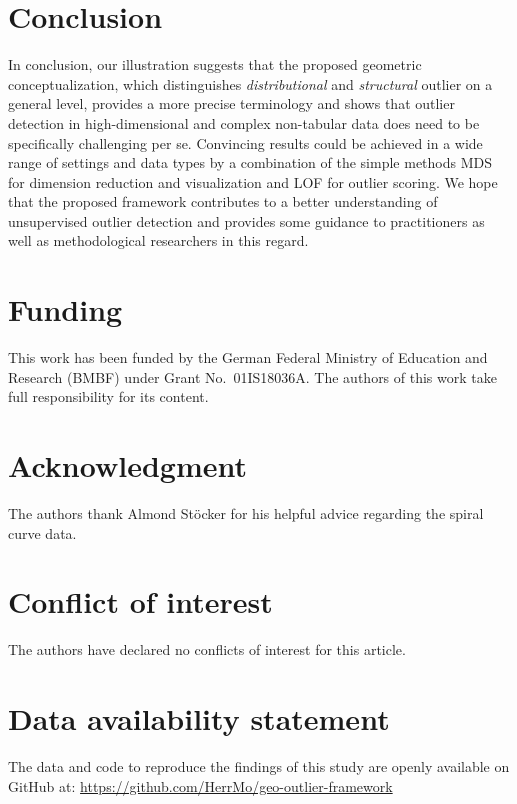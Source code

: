 \documentclass[
  10pt]{article}
\begin{document}
\hypertarget{sec:conclusion}{%
\section{Conclusion}\label{sec:conclusion}}

In conclusion, our illustration suggests that the proposed geometric conceptualization, which distinguishes \emph{distributional} and \emph{structural} outlier on a general level, provides a more precise terminology and shows that outlier detection in high-dimensional and complex non-tabular data does need to be specifically challenging per se. Convincing results could be achieved in a wide range of settings and data types by a combination of the simple methods MDS for dimension reduction and visualization and LOF for outlier scoring. We hope that the proposed framework contributes to a better understanding of unsupervised outlier detection and provides some guidance to practitioners as well as methodological researchers in this regard.

\section*{Funding}

This work has been funded by the German Federal Ministry of Education and Research (BMBF) under Grant No.~01IS18036A. The authors of this work take full responsibility for its content.

\section*{Acknowledgment}

The authors thank Almond Stöcker for his helpful advice regarding the spiral curve data.

\section*{Conflict of interest}

The authors have declared no conflicts of interest for this article.

\section*{Data availability statement}

The data and code to reproduce the findings of this study are openly available on GitHub at:
\url{https://github.com/HerrMo/geo-outlier-framework}
\end{document}
